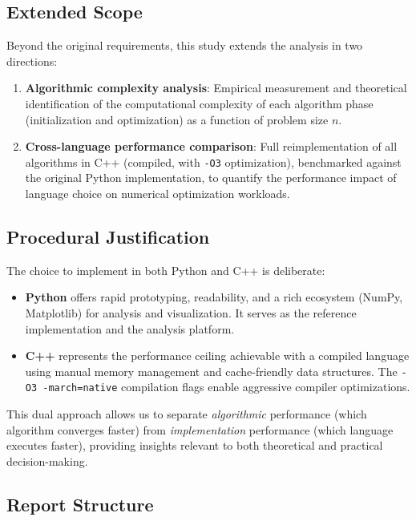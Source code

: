 \documentclass[12pt,a4paper]{article}
\begin{document}
\subsection{Extended Scope}

Beyond the original requirements, this study extends the analysis in two directions:

\begin{enumerate}
  \item \textbf{Algorithmic complexity analysis}: Empirical measurement and theoretical identification of the computational complexity of each algorithm phase (initialization and optimization) as a function of problem size $n$.
  \item \textbf{Cross-language performance comparison}: Full reimplementation of all algorithms in C++ (compiled, with \texttt{-O3} optimization), benchmarked against the original Python implementation, to quantify the performance impact of language choice on numerical optimization workloads.
\end{enumerate}

\subsection{Procedural Justification}

The choice to implement in both Python and C++ is deliberate:

\begin{itemize}
  \item \textbf{Python} offers rapid prototyping, readability, and a rich ecosystem (NumPy, Matplotlib) for analysis and visualization. It serves as the reference implementation and the analysis platform.
  \item \textbf{C++} represents the performance ceiling achievable with a compiled language using manual memory management and cache-friendly data structures. The \texttt{-O3 -march=native} compilation flags enable aggressive compiler optimizations.
\end{itemize}

This dual approach allows us to separate \emph{algorithmic} performance (which algorithm converges faster) from \emph{implementation} performance (which language executes faster), providing insights relevant to both theoretical and practical decision-making.

\subsection{Report Structure}
\end{document}
